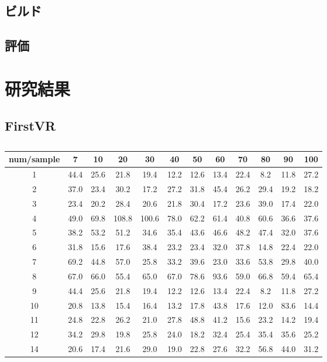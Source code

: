 \documentclass{ltjsreport}
\begin{document}
	\section{ビルド}
	\section{評価}

\chapter{研究結果}
	\section{FirstVR}
		\begin{table}[H]
		\begin{center}
		\caption{}
		\label{}
		\begin{tabular}{c|ccccccccccc} \toprule
			num/sample & 7 & 10 & 20 & 30 & 40 & 50 & 60 & 70 & 80 & 90 & 100 \\ \hline
			1 & 44.4 & 25.6 & 21.8 & 19.4 & 12.2 & 12.6 & 13.4 & 22.4 & 8.2 & 11.8 & 27.2 \\
			2 & 37.0 & 23.4 & 30.2 & 17.2 & 27.2 & 31.8 & 45.4 & 26.2 & 29.4 & 19.2 & 18.2 \\
			3 & 23.4 & 20.2 & 28.4 & 20.6 & 21.8 & 30.4 & 17.2 & 23.6 & 39.0 & 17.4 & 22.0 \\
			4 & 49.0 & 69.8 & 108.8 & 100.6 & 78.0 & 62.2 & 61.4 & 40.8 & 60.6 & 36.6 & 37.6 \\
			5 & 38.2 & 53.2 & 51.2 & 34.6 & 35.4 & 43.6 & 46.6 & 48.2 & 47.4 & 32.0 & 37.6 \\
			6 & 31.8 & 15.6 & 17.6 & 38.4 & 23.2 & 23.4 & 32.0 & 37.8 & 14.8 & 22.4 & 22.0 \\
			7 & 69.2 & 44.8 & 57.0 & 25.8 & 33.2 & 39.6 & 23.0 & 33.6 & 53.8 & 29.8 & 40.0 \\
			8 & 67.0 & 66.0 & 55.4 & 65.0 & 67.0 & 78.6 & 93.6 & 59.0 & 66.8 & 59.4 & 65.4 \\
			9 & 44.4 & 25.6 & 21.8 & 19.4 & 12.2 & 12.6 & 13.4 & 22.4 & 8.2 & 11.8 & 27.2 \\
			10 & 20.8 & 13.8 & 15.4 & 16.4 & 13.2 & 17.8 & 43.8 & 17.6 & 12.0 & 83.6 & 14.4 \\
			11 & 24.8 & 22.8 & 26.2 & 21.0 & 27.8 & 48.8 & 41.2 & 15.6 & 23.2 & 14.2 & 19.4 \\
			12 & 34.2 & 29.8 & 19.8 & 25.8 & 24.0 & 18.2 & 32.4 & 25.4 & 35.4 & 35.6 & 25.2 \\
			14 & 20.6 & 17.4 & 21.6 & 29.0 & 19.0 & 22.8 & 27.6 & 32.2 & 56.8 & 44.0 & 31.2 \\

\end{tabular}
\end{center}
\end{table}
\end{document}
